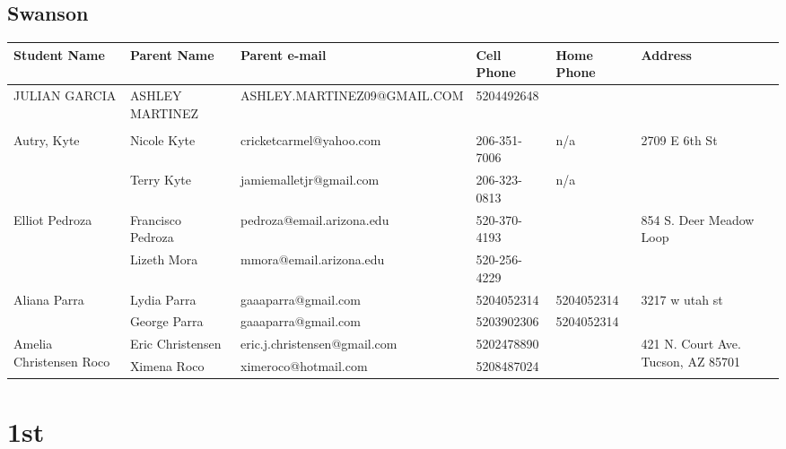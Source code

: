 \documentclass[landscape]{article}\usepackage[]{graphicx}\usepackage[]{color}
\begin{document}
\subsection{Swanson}
\begin{longtable}{p{70pt}|p{75pt}|p{120pt}|p{60pt}|p{60pt}|p{120pt}|}
Student Name & Parent Name & Parent e-mail & Cell Phone & Home Phone & Address\\
\hline
\multirow{2}{70pt}{JULIAN GARCIA} & ASHLEY MARTINEZ & ASHLEY.MARTINEZ09@GMAIL.COM & 5204492648 &  & \multirow{2}{100pt}{} \\
 &  &  &  &  & \\
\hline
\multirow{2}{70pt}{Autry, Kyte} & Nicole Kyte & cricketcarmel@yahoo.com & 206-351-7006 & n/a & \multirow{2}{100pt}{2709 E 6th St} \\
 & Terry Kyte & jamiemalletjr@gmail.com & 206-323-0813 & n/a & \\
\hline
\multirow{2}{70pt}{Elliot Pedroza} & Francisco Pedroza & pedroza@email.arizona.edu & 520-370-4193 &  & \multirow{2}{100pt}{854 S. Deer Meadow Loop} \\
 & Lizeth Mora & mmora@email.arizona.edu & 520-256-4229 &  & \\
\hline
\multirow{2}{70pt}{Aliana Parra} & Lydia Parra & gaaaparra@gmail.com & 5204052314 & 5204052314 & \multirow{2}{100pt}{3217 w utah st} \\
 & George Parra & gaaaparra@gmail.com & 5203902306 & 5204052314 & \\
\hline
\multirow{2}{70pt}{Amelia Christensen Roco} & Eric Christensen & eric.j.christensen@gmail.com & 5202478890 &  & \multirow{2}{100pt}{421 N. Court Ave. Tucson, AZ 85701} \\
 & Ximena Roco & ximeroco@hotmail.com & 5208487024 &  & \\
\hline
\end{longtable}
\newpage
\section{1st}
\end{document}
